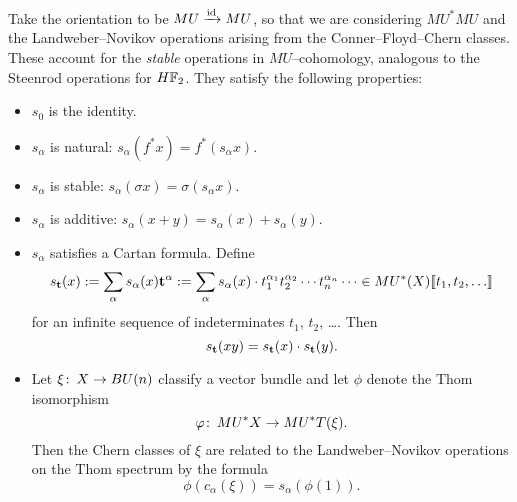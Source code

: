 \begin{definition}
Take the orientation to be $MU \xrightarrow{\mathrm{id}} MU$, so that we are considering $MU^* MU$ and the Landweber--Novikov operations arising from the Conner--Floyd--Chern classes.  These account for the \emph{stable} operations in $MU$--cohomology, analogous to the Steenrod operations for $\HFtwo$.  They satisfy the following properties:
\begin{itemize}
\item $s_0$ is the identity.
\item $s_\alpha$ is natural: $s_\alpha(f^* x) = f^*(s_\alpha x)$.
\item $s_\alpha$ is stable: $s_\alpha(\sigma x) = \sigma(s_\alpha x)$.
\item $s_\alpha$ is additive: $s_\alpha(x + y) = s_\alpha(x) + s_\alpha(y)$.
\item $s_\alpha$ satisfies a Cartan formula.  Define \[s_{\mathbf t}(x) := \sum_{\alpha} s_\alpha(x) \mathbf t^\alpha := \sum_\alpha s_\alpha(x) \cdot t_1^{\alpha_1} t_2^{\alpha_2} \cdots t_n^{\alpha_n} \cdots \in MU^*(X)\llbracket{t_1, t_2, \ldots}\rrbracket\] for an infinite sequence of indeterminates $t_1$, $t_2$, \ldots.  Then \[s_{\mathbf t}(x y) = s_{\mathbf t}(x) \cdot s_{\mathbf t}(y).\]
\item Let $\xi\colon\thinspace X \to BU(n)$ classify a vector bundle and let $\phi$ denote the Thom isomorphism \[\varphi\colon\thinspace MU^* X \to MU^* T(\xi).\]  Then the Chern classes of $\xi$ are related to the Landweber--Novikov operations on the Thom spectrum by the formula \[\phi(c_\alpha(\xi)) = s_\alpha(\phi(1)).\]
\end{itemize}
\end{definition}

